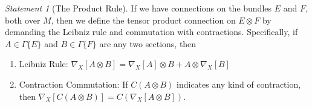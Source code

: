 \documentclass[11pt]{article}
\theoremstyle{remark}
\newtheorem{statementr}{Statement}
\begin{document}
\begin{statementr}[The Product Rule] 
If we have connections on the bundles $E$ and $F$, both over $M$, then
we define the tensor product connection  on $E
\otimes F$  by demanding the Leibniz rule and commutation
with contractions. Specifically, 
if $A \in \ensuremath{\Gamma \{ E \}}$ and $B \in \ensuremath{\Gamma \{ F \}}$ are any two sections,
then 
\begin{enumerate} 
\item {Leibniz Rule:} 
 $\ensuremath{{{\nabla}}_{X}^{}{[A\otimes B]}} = \ensuremath{{{\nabla}}_{X}^{}{[A]}} \otimes B + A \otimes
\ensuremath{{{\nabla}}_{X}^{}{[B]}}$
\item{Contraction Commutation:} If  $C( A \otimes B)$ indicates any kind of
contraction, then 
$ \ensuremath{{{\nabla}}_{X}^{}{[C(A\otimes B)]}} = C( \ensuremath{{{\nabla}}_{X}^{}{[A \otimes B]}})$. 
\end{enumerate}
\end{statementr}
\end{document}
